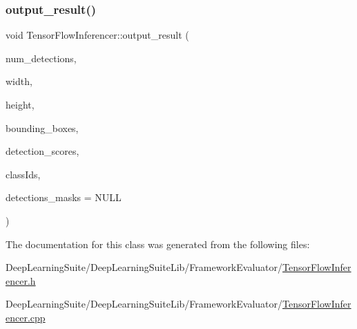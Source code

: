 \subsubsection{\texorpdfstring{output\+\_\+result()}{output\_result()}}
{\footnotesize\ttfamily void Tensor\+Flow\+Inferencer\+::output\+\_\+result (\begin{DoxyParamCaption}\item[{int}]{num\+\_\+detections,  }\item[{int}]{width,  }\item[{int}]{height,  }\item[{Py\+Object $\ast$}]{bounding\+\_\+boxes,  }\item[{Py\+Object $\ast$}]{detection\+\_\+scores,  }\item[{Py\+Object $\ast$}]{class\+Ids,  }\item[{Py\+Object $\ast$}]{detections\+\_\+masks = {\ttfamily NULL} }\end{DoxyParamCaption})}



The documentation for this class was generated from the following files\+:\begin{DoxyCompactItemize}
\item 
Deep\+Learning\+Suite/\+Deep\+Learning\+Suite\+Lib/\+Framework\+Evaluator/\hyperlink{_tensor_flow_inferencer_8h}{Tensor\+Flow\+Inferencer.\+h}\item 
Deep\+Learning\+Suite/\+Deep\+Learning\+Suite\+Lib/\+Framework\+Evaluator/\hyperlink{_tensor_flow_inferencer_8cpp}{Tensor\+Flow\+Inferencer.\+cpp}\end{DoxyCompactItemize}
